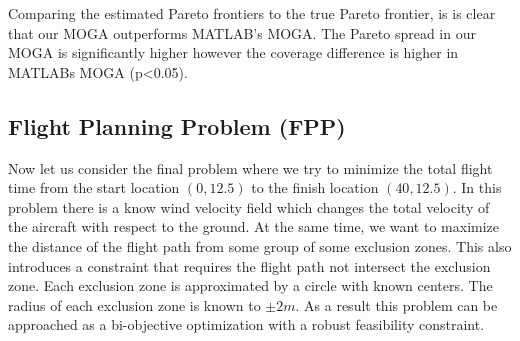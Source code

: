 \documentclass{article}
\begin{document}
Comparing the estimated Pareto frontiers to the true Pareto frontier, is is clear that our MOGA outperforms MATLAB's MOGA. The Pareto spread in our MOGA is significantly higher however the coverage difference is higher in MATLABs MOGA (p<0.05).
 
\subsection{Flight Planning Problem (FPP)}
Now let us consider the final problem where we try to minimize the total flight time from the start location $(0,12.5)$ to the finish location $(40,12.5)$.  In this problem there is a know wind velocity field which changes the total velocity of the aircraft with respect to the ground.  At the same time, we want to maximize the distance of the flight path from some group of some exclusion zones. This also introduces a constraint that requires the flight path not intersect the exclusion zone. Each exclusion zone is approximated by a circle with known centers.  The radius of each exclusion zone is known to $\pm 2m$.  As a result this problem can be approached as a bi-objective optimization with a robust feasibility constraint. 
\end{document}
